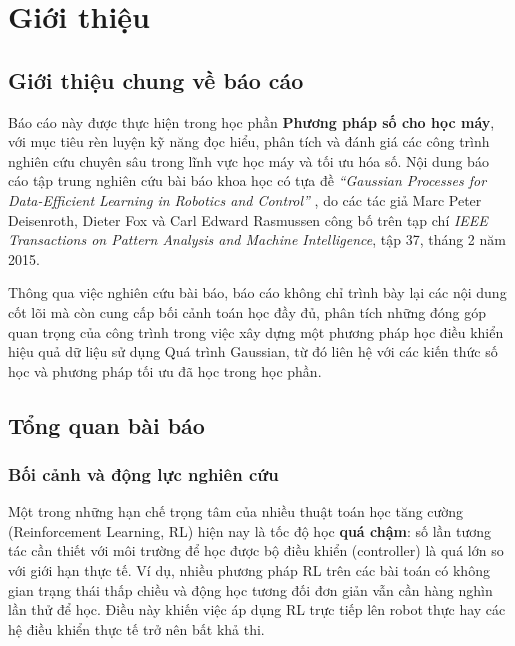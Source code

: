 \section{Giới thiệu}
\label{SEC_intro}

\subsection{Giới thiệu chung về báo cáo}
\label{SUB_SEC_gioi_thieu_chung}

Báo cáo này được thực hiện trong học phần \textbf{Phương pháp số cho học máy}, với mục tiêu rèn luyện kỹ năng đọc hiểu, phân tích và đánh giá các công trình nghiên cứu chuyên sâu trong lĩnh vực học máy và tối ưu hóa số. Nội dung báo cáo tập trung nghiên cứu bài báo khoa học có tựa đề \textit{``Gaussian Processes for Data-Efficient Learning in Robotics and Control''} \cite{Deisenroth_2015}, do các tác giả Marc Peter Deisenroth, Dieter Fox và Carl Edward Rasmussen công bố trên tạp chí \textit{IEEE Transactions on Pattern Analysis and Machine Intelligence}, tập 37, tháng 2 năm 2015.
\medskip

Thông qua việc nghiên cứu bài báo, báo cáo không chỉ trình bày lại các nội dung cốt lõi mà còn cung cấp bối cảnh toán học đầy đủ, phân tích những đóng góp quan trọng của công trình trong việc xây dựng một phương pháp học điều khiển hiệu quả dữ liệu sử dụng Quá trình Gaussian, từ đó liên hệ với các kiến thức số học và phương pháp tối ưu đã học trong học phần.
\medskip

\subsection{Tổng quan bài báo}
\label{SUB_SEC_tong_quan}

\subsubsection{Bối cảnh và động lực nghiên cứu}
\label{SUB_SUB_SEC_boi_canh}

Một trong những hạn chế trọng tâm của nhiều thuật toán học tăng cường (Reinforcement Learning, RL) hiện nay là tốc độ học \textbf{quá chậm}: số lần tương tác cần thiết với môi trường để học được bộ điều khiển (controller) là quá lớn so với giới hạn thực tế. Ví dụ, nhiều phương pháp RL trên các bài toán có không gian trạng thái thấp chiều và động học tương đối đơn giản vẫn cần hàng nghìn lần thử để học. Điều này khiến việc áp dụng RL trực tiếp lên robot thực hay các hệ điều khiển thực tế trở nên bất khả thi.
\medskip

